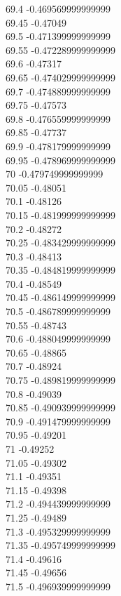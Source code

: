 {69.4	-0.469569999999999\\
69.45	-0.47049\\
69.5	-0.471399999999999\\
69.55	-0.472289999999999\\
69.6	-0.47317\\
69.65	-0.474029999999999\\
69.7	-0.474889999999999\\
69.75	-0.47573\\
69.8	-0.476559999999999\\
69.85	-0.47737\\
69.9	-0.478179999999999\\
69.95	-0.478969999999999\\
70	-0.479749999999999\\
70.05	-0.48051\\
70.1	-0.48126\\
70.15	-0.481999999999999\\
70.2	-0.48272\\
70.25	-0.483429999999999\\
70.3	-0.48413\\
70.35	-0.484819999999999\\
70.4	-0.48549\\
70.45	-0.486149999999999\\
70.5	-0.486789999999999\\
70.55	-0.48743\\
70.6	-0.488049999999999\\
70.65	-0.48865\\
70.7	-0.48924\\
70.75	-0.489819999999999\\
70.8	-0.49039\\
70.85	-0.490939999999999\\
70.9	-0.491479999999999\\
70.95	-0.49201\\
71	-0.49252\\
71.05	-0.49302\\
71.1	-0.49351\\
71.15	-0.49398\\
71.2	-0.494439999999999\\
71.25	-0.49489\\
71.3	-0.495329999999999\\
71.35	-0.495749999999999\\
71.4	-0.49616\\
71.45	-0.49656\\
71.5	-0.496939999999999\\
}
